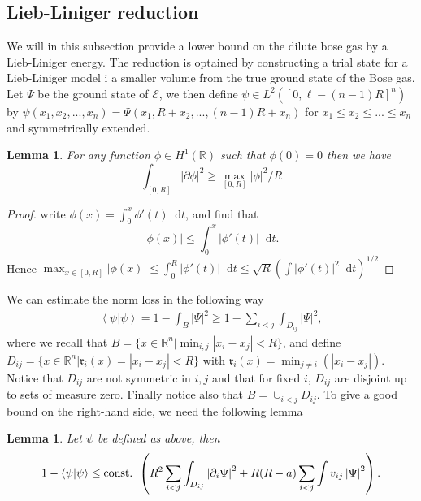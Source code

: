 \documentclass[a4paper,11pt]{article}
\newcommand{\abs}[1]{\left\lvert #1 \right\rvert}
\renewcommand{\braket}[1]{\left\langle#1\right\rangle}
\newcommand*\diff{\mathop{}\!\mathrm{d}}
\newcommand{\R}{\mathbb{R}}
\newtheorem{lemma}[theorem]{Lemma}
\numberwithin{equation}{section}
\begin{document}
	\subsection{Lieb-Liniger reduction}
	We will in this subsection provide a lower bound on the dilute bose gas by a Lieb-Liniger energy. The reduction is optained by constructing a trial state for a Lieb-Liniger model i a smaller volume from the true ground state of the Bose gas.\\
		Let $ \Psi $ be the ground state of $ \mathcal{E} $, we then define $ \psi\in L^2([0,\ell-(n-1)R]^n) $ by $ \psi(x_1,x_2,...,x_n)=\Psi(x_1,R+x_2,...,(n-1)R+x_n) $ for $ x_1\leq x_2\leq...\leq x_n $ and symmetrically extended. 
	\begin{lemma}
		For any function $ \phi\in H^1(\R) $ such that $ \phi(0)=0 $ then we have\begin{equation}\label{EqSobolevIneq}
		\int_{[0,R]}\abs{\partial\phi}^2\geq \max_{[0,R]}\abs{\phi}^2/R
		\end{equation}
	\end{lemma}
	\begin{proof}
		write $ \phi(x)=\int_{0}^{x}\phi'(t)\diff t $, and find that \begin{equation}
		\abs{\phi(x)}\leq \int_{0}^{x}\abs{\phi'(t)}\diff t.
		\end{equation}
		Hence $ \max_{x\in[0,R]}\abs{\phi(x)}\leq \int_{0}^{R}\abs{\phi'(t)}\diff t\leq \sqrt{R}\left(\int\abs{\phi'(t)}^2\diff t\right)^{1/2} $
	\end{proof}
	We can estimate the norm loss in the following way
	\begin{equation}\label{EqNormBoundBij}
	\begin{aligned}
	\braket{\psi|\psi}=1-\int_{B}\abs{\Psi}^2\geq 1-\sum_{i<j}\int_{D_{ij}}\abs{\Psi}^2,
	\end{aligned}
	\end{equation}
	where we recall that $ B=\{x\in\R^n\vert \min_{i,j}\abs{x_i-x_j}<R \} $, and define $ D_{ij}=\{x\in\R^n \vert \mathfrak{r}_i(x)=\abs{x_i-x_j}<R \} $ with $ \mathfrak{r}_i(x)=\min_{j\neq i}(\abs{x_i-x_j}) $. Notice that $ D_{ij} $ are not symmetric in $ i,j $ and that for fixed $ i $, $ D_{ij} $ are disjoint up to sets of measure zero. Finally notice also that $ B=\cup_{i<j}D_{ij} $.  To give a good bound on the right-hand side, we need the following lemma
	\begin{lemma}\label{LemmaNormLoss}
		Let $ \psi $ be defined as above, then \begin{equation}
		1-\braket{\psi|\psi}\leq\textnormal{const. } \left(R^2\sum_{i<j}\int_{D_{ij}}\abs{\partial_i \Psi}^2+R(R-a)\sum_{i<j}\int v_{ij} \abs{\Psi}^2\right).
		\end{equation}
	\end{lemma}
\end{document}
